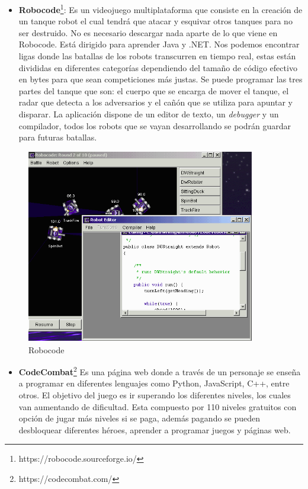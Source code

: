 \begin{itemize}
\item \textbf{Robocode}\footnote{https://robocode.sourceforge.io/}: Es un videojuego multiplataforma que consiste en la creación de un tanque robot el cual tendrá que atacar y esquivar otros tanques para no ser destruido. No es necesario descargar nada aparte de lo que viene en Robocode. Está dirigido para aprender Java y .NET. Nos podemos encontrar ligas donde las batallas de los robots transcurren en tiempo real, estas están divididas en diferentes categorías dependiendo del tamaño de código efectivo en bytes para que sean competiciones más justas. Se puede programar las tres partes del tanque que son: el cuerpo que se encarga de mover el tanque, el radar que detecta a los adversarios y el cañón que se utiliza para apuntar y disparar. La aplicación dispone de un editor de texto, un \textit{debugger} y un compilador, todos los robots que se vayan desarrollando se podrán guardar para futuras batallas.\cite{app}
\end{itemize}

\begin{figure}[H]
    \centering
    \includegraphics[width=10cm, keepaspectratio]{img/Robocode.png}
    \caption{Robocode}
    \label{fig:robocode}
\end{figure}

\begin{itemize}
\item \textbf{CodeCombat}\footnote{ https://codecombat.com/} Es una página web donde a través de un personaje se enseña a programar en diferentes lenguajes como Python, JavaScript, C++, entre otros. El objetivo del juego es ir superando los diferentes niveles, los cuales van aumentando de dificultad. Esta compuesto por 110 niveles gratuitos con opción de jugar más niveles si se paga, además pagando se pueden desbloquear diferentes héroes, aprender a programar juegos y páginas web.\cite{app}
\end{itemize}

